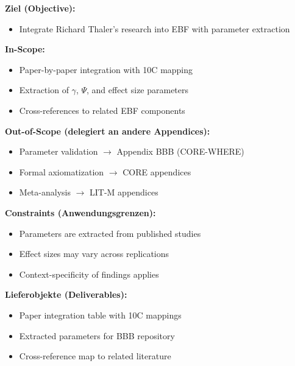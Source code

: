 
\begin{tcolorbox}[
    colback=orange!5!white,
    colframe=orange!75!black,
    title={\textbf{Appendix Scope: Ziel / In-Scope / Out-of-Scope / Constraints}},
    fonttitle=\bfseries
]

\textbf{Ziel (Objective):}
\begin{itemize}[nosep]
    \item Integrate Richard Thaler's research into EBF with parameter extraction
\end{itemize}

\textbf{In-Scope:}
\begin{itemize}[nosep]
    \item Paper-by-paper integration with 10C mapping
    \item Extraction of $\gamma$, $\Psi$, and effect size parameters
    \item Cross-references to related EBF components
\end{itemize}

\textbf{Out-of-Scope (delegiert an andere Appendices):}
\begin{itemize}[nosep]
    \item Parameter validation $\rightarrow$ Appendix BBB (CORE-WHERE)
    \item Formal axiomatization $\rightarrow$ CORE appendices
    \item Meta-analysis $\rightarrow$ LIT-M appendices
\end{itemize}

\textbf{Constraints (Anwendungsgrenzen):}
\begin{itemize}[nosep]
    \item Parameters are extracted from published studies
    \item Effect sizes may vary across replications
    \item Context-specificity of findings applies
\end{itemize}

\textbf{Lieferobjekte (Deliverables):}
\begin{itemize}[nosep]
    \item Paper integration table with 10C mappings
    \item Extracted parameters for BBB repository
    \item Cross-reference map to related literature
\end{itemize}

\end{tcolorbox}

